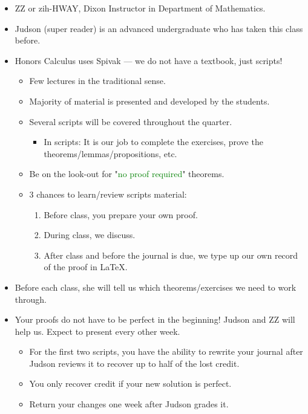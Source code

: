 \documentclass[titlepage]{article}
\newcounter{script}
\theoremstyle{definition}
\begin{document}
\begin{itemize}
    \item {}ZZ or zih-HWAY, Dixon Instructor in Department of Mathematics.
    \item Judson (super reader) is an advanced undergraduate who has taken this class before.
    \item Honors Calculus uses Spivak --- we do not have a textbook, just scripts!
    \begin{itemize}
        \item Few lectures in the traditional sense.
        \item Majority of material is presented and developed by the students.
        \item Several scripts will be covered throughout the quarter.
        \begin{itemize}
            \item In scripts: It is our job to complete the exercises, prove the theorems/lemmas/propositions, etc.
        \end{itemize}
        \item Be on the look-out for "\textcolor{green}{no proof required}" theorems.
        \item 3 chances to learn/review scripts material:
        \begin{enumerate}
            \item Before class, you prepare your own proof.
            \item During class, we discuss.
            \item After class and before the journal is due, we type up our own record of the proof in \LaTeX.
        \end{enumerate}
    \end{itemize}
    \item Before each class, she will tell us which theorems/exercises we need to work through.
    \item Your proofs do not have to be perfect in the beginning! Judson and ZZ will help us. Expect to present every other week.
    \begin{itemize}
        \item For the first two scripts, you have the ability to rewrite your journal after Judson reviews it to recover up to half of the lost credit.
        \item You only recover credit if your new solution is perfect.
        \item Return your changes one week after Judson grades it.

\end{itemize}
\end{itemize}
\end{document}
